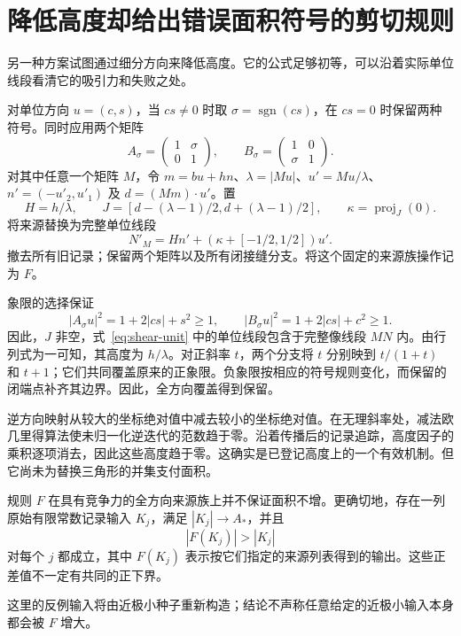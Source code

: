 \section{降低高度却给出错误面积符号的剪切规则}\label{sec:shear}
另一种方案试图通过细分方向来降低高度。它的公式足够初等，可以沿着实际单位线段看清它的吸引力和失败之处。

对单位方向 $u=(c,s)$，当 $cs\ne0$ 时取 $\sigma=\operatorname{sgn}(cs)$，在 $cs=0$ 时保留两种符号。同时应用两个矩阵
\[
 A_\sigma=\begin{pmatrix}1&\sigma\\0&1\end{pmatrix},\qquad
 B_\sigma=\begin{pmatrix}1&0\\\sigma&1\end{pmatrix}.
\]
对其中任意一个矩阵 $M$，令 $m=bu+hn$、$\lambda=|Mu|$、$u'=Mu/\lambda$、$n'=(-u'_2,u'_1)$ 及 $d=(Mm)\cdot u'$。置
\[
 H=h/\lambda,\qquad
 J=[d-(\lambda-1)/2,d+(\lambda-1)/2],\qquad
 \kappa=\operatorname{proj}_{J}(0).
\]
将来源替换为完整单位线段
\begin{equation}\label{eq:shear-unit}
 N'_M=Hn'+(\kappa+[-1/2,1/2])u'.
\end{equation}
撤去所有旧记录；保留两个矩阵以及所有闭接缝分支。将这个固定的来源族操作记为 $F$。

象限的选择保证
\[
 |A_\sigma u|^2=1+2|cs|+s^2\ge1,\qquad
 |B_\sigma u|^2=1+2|cs|+c^2\ge1.
\]
因此，$J$ 非空，式~\eqref{eq:shear-unit} 中的单位线段包含于完整像线段 $MN$ 内。由行列式为一可知，其高度为 $h/\lambda$。对正斜率 $t$，两个分支将 $t$ 分别映到 $t/(1+t)$ 和 $t+1$；它们共同覆盖原来的正象限。负象限按相应的符号规则变化，而保留的闭端点补齐其边界。因此，全方向覆盖得到保留。

逆方向映射从较大的坐标绝对值中减去较小的坐标绝对值。在无理斜率处，减法欧几里得算法使未归一化逆迭代的范数趋于零。沿着传播后的记录追踪，高度因子的乘积逐项消去，因此这些高度趋于零。这确实是已登记高度上的一个有效机制。但它尚未为替换三角形的并集支付面积。

\begin{theorem}[固定双剪切规则的失败]\label{thm:shear-failure}
规则 $F$ 在具有竞争力的全方向来源族上并不保证面积不增。更确切地，存在一列原始有限常数记录输入 $K_j$，满足 $|K_j|\to A_*$，并且
\[
 |F(K_j)|>|K_j|
\]
对每个 $j$ 都成立，其中 $F(K_j)$ 表示按它们指定的来源列表得到的输出。这些正差值不一定有共同的正下界。
\end{theorem}
这里的反例输入将由近极小种子重新构造；结论不声称任意给定的近极小输入本身都会被 $F$ 增大。

